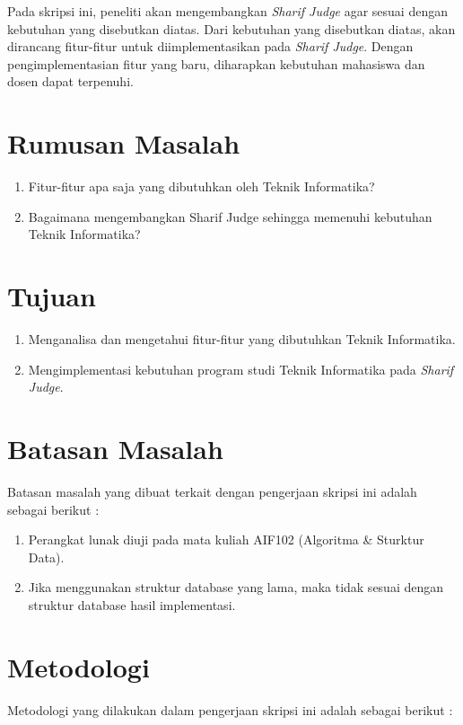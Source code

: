 Pada skripsi ini, peneliti akan mengembangkan \textit{Sharif Judge} agar sesuai dengan kebutuhan yang disebutkan diatas. Dari kebutuhan yang disebutkan diatas, akan dirancang fitur-fitur untuk diimplementasikan pada \textit{Sharif Judge}. Dengan pengimplementasian fitur yang baru, diharapkan kebutuhan mahasiswa dan dosen dapat terpenuhi.

\section{Rumusan Masalah}
\label{sec:rumusan}
\begin{enumerate}
	\item Fitur-fitur apa saja yang dibutuhkan oleh Teknik Informatika?
	\item Bagaimana mengembangkan Sharif Judge sehingga memenuhi kebutuhan Teknik Informatika?
\end{enumerate}

\section{Tujuan}
\label{sec:tujuan}
\begin{enumerate}
	\item Menganalisa dan mengetahui fitur-fitur yang dibutuhkan Teknik Informatika.
	\item Mengimplementasi kebutuhan program studi Teknik Informatika pada \textit{Sharif Judge}.
\end{enumerate}

\section{Batasan Masalah}
\label{sec:batasan}
Batasan masalah yang dibuat terkait dengan pengerjaan skripsi ini adalah sebagai berikut :
\begin{enumerate}
	\item Perangkat lunak diuji pada mata kuliah AIF102 (Algoritma \& Sturktur Data).
	\item Jika menggunakan struktur database yang lama, maka tidak sesuai dengan struktur database hasil implementasi.
\end{enumerate}

\section{Metodologi}
\label{sec:metlit}Metodologi yang dilakukan dalam pengerjaan skripsi ini adalah sebagai berikut :

